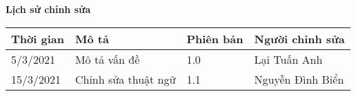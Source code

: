 \documentclass[./main.tex]{subfiles}
\begin{document}
\begin{center}
	\Large{\textbf{Lịch sử chỉnh sửa}}
	\begin{table}[H]
		\begin{tabular}{|p{}|p{}|p{}|p{}|}
			\hline
			\textbf{Thời gian} & \textbf{Mô tả}      & \textbf{Phiên bản} & \textbf{Người chỉnh sửa} \\ \hline
			5/3/2021           & Mô tả vấn đề        & 1.0                & Lại Tuấn Anh             \\ \hline
			15/3/2021          & Chỉnh sửa thuật ngữ & 1.1                & Nguyễn Đình Biển         \\ \hline
		\end{tabular}
	\end{table}
\end{center}
\end{document}
